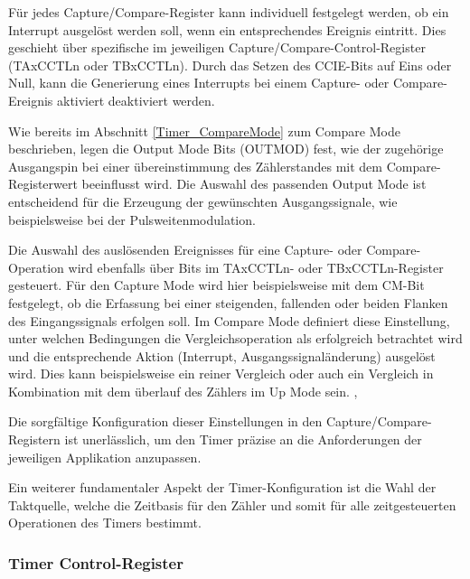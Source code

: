 F\"ur jedes Capture/Compare-Register kann individuell festgelegt werden, ob ein Interrupt ausgel\"ost werden soll, wenn ein entsprechendes Ereignis eintritt. Dies geschieht \"uber spezifische  im jeweiligen Capture/Compare-Control-Register (TAxCCTLn oder TBxCCTLn). Durch das Setzen des CCIE-Bits auf Eins oder Null, kann die Generierung eines Interrupts bei einem Capture- oder Compare-Ereignis aktiviert \bzw deaktiviert werden.

Wie bereits im Abschnitt \ref{Timer_CompareMode} zum Compare Mode beschrieben, legen die Output Mode Bits (OUTMOD) fest, wie der zugeh\"orige Ausgangspin bei einer \"ubereinstimmung des Z\"ahlerstandes mit dem Compare-Registerwert beeinflusst wird. Die Auswahl des passenden Output Mode ist entscheidend f\"ur die Erzeugung der gew\"unschten Ausgangssignale, wie beispielsweise bei der Pulsweitenmodulation.

Die Auswahl des ausl\"osenden Ereignisses f\"ur eine Capture- oder Compare-Operation wird ebenfalls \"uber Bits im TAxCCTLn- oder TBxCCTLn-Register gesteuert. F\"ur den Capture Mode wird hier beispielsweise mit dem CM-Bit festgelegt, ob die Erfassung bei einer steigenden, fallenden oder beiden Flanken des Eingangssignals erfolgen soll. Im Compare Mode definiert diese Einstellung, unter welchen Bedingungen die Vergleichsoperation als erfolgreich betrachtet wird und die entsprechende Aktion (Interrupt, Ausgangssignal\"anderung) ausgel\"ost wird. Dies kann beispielsweise ein reiner Vergleich oder auch ein Vergleich in Kombination mit dem \"uberlauf des Z\"ahlers im Up Mode sein. , 

Die sorgf\"altige Konfiguration dieser Einstellungen in den Capture/Compare-Registern ist unerl\"asslich, um den Timer pr\"azise an die Anforderungen der jeweiligen Applikation anzupassen.

Ein weiterer fundamentaler Aspekt der Timer-Konfiguration ist \ua die Wahl der Taktquelle, welche die Zeitbasis f\"ur den Z\"ahler und somit f\"ur alle zeitgesteuerten Operationen des Timers bestimmt.


\subsubsection{Timer Control-Register}
\label{TimerControlRegister}

